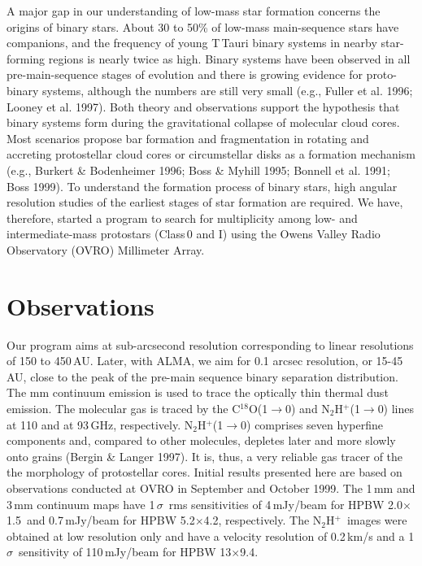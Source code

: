 A major gap in our understanding of low-mass star formation 
concerns the origins of binary stars. 
About 30 to 50\% 
of low-mass main-sequence stars have companions, and the frequency 
of young T\,Tauri binary systems in nearby star-forming 
regions is nearly twice as high.
Binary systems have been observed in all pre-main-sequence 
stages of evolution and there is growing evidence for 
proto-binary systems, although the numbers 
are still very small 
(e.g., Fuller et al. 1996; Looney et al. 1997).
Both theory and observations support the hypothesis that binary 
systems form during the gravitational 
collapse of molecular cloud cores. 
Most scenarios propose bar formation and 
fragmentation in rotating and accreting protostellar cloud cores 
or circumstellar disks as a formation mechanism 
(e.g., Burkert \& Bodenheimer 1996; Boss \& Myhill 1995; Bonnell et al. 1991; 
Boss 1999).
To understand the formation process of binary stars, 
high angular resolution studies of the earliest stages 
of star formation are required. 
We have, therefore, started a program to search for multiplicity among low- 
and intermediate-mass protostars (Class\,0 and I) using the 
Owens Valley Radio Observatory (OVRO) Millimeter Array.


\section{Observations}

Our program  aims at sub-arcsecond resolution corresponding to 
linear resolutions of 150 to 450\,AU. 
Later, with ALMA, we aim
    for 0.1 arcsec resolution, or 15-45 AU, 
    close to the peak of the pre-main sequence
    binary separation distribution. 
The mm continuum emission is used to trace the optically 
thin thermal dust emission.
The molecular gas is traced by the 
C$^{18}$O(1$\rightarrow$0) and 
N$_2$H$^+$(1$\rightarrow$0) lines at 110 and at 93\,GHz, respectively. 
N$_2$H$^+$(1$\rightarrow$0) comprises seven 
hyperfine components and, compared to other molecules, 
depletes later and more slowly onto grains (Bergin \& Langer 1997). 
It is, thus, a very reliable gas 
tracer of the the morphology of protostellar cores.
%
Initial results presented here are based on observations 
conducted at OVRO in September and October 1999.
The 1\,mm and 3\,mm continuum maps have 1\,$\sigma$\ rms sensitivities of 
4\,mJy/beam for HPBW 2.0\arcsec$\times$1.5\arcsec\ and 
0.7\,mJy/beam for HPBW 5.2\arcsec$\times$4.2\arcsec, 
respectively.
The N$_2$H$^+$\ images were obtained at low resolution only and 
have a velocity resolution of 0.2\,km/s and a 1\,$\sigma$\ sensitivity of 
110\,mJy/beam for HPBW 13\arcsec$\times$9.4\arcsec.

